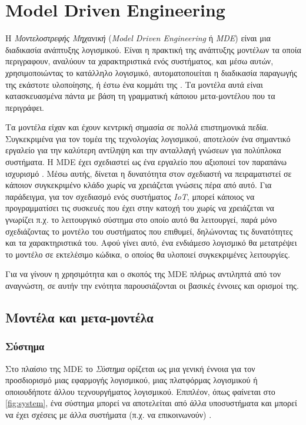 \section{Model Driven Engineering}
\label{sec:theory_mde}

Η \textit{Μοντελοστρεφής Μηχανική} (\textit{Model Driven Engineering} ή \textit{MDE}) είναι μια διαδικασία ανάπτυξης λογισμικού. Είναι η πρακτική της ανάπτυξης μοντέλων τα οποία περιγραφουν, αναλύουν τα χαρακτηριστικά ενός συστήματος, και μέσω αυτών, χρησιμοποιώντας το κατάλληλο λογισμικό, αυτοματοποιείται η διαδικασία παραγωγής της εκάστοτε υλοποίησης, ή έστω ένα κομμάτι της \cite{bib:brambilla_2012}. Τα μοντέλα αυτά είναι κατασκευασμένα πάντα με βάση τη γραμματική κάποιου μετα-μοντέλου που τα περιγράφει.

Τα μοντέλα είχαν και έχουν κεντρική σημασία σε πολλά επιστημονικά πεδία. Συγκεκριμένα για τον τομέα της τεχνολογίας λογισμικού, αποτελούν ένα σημαντικό εργαλείο για την καλύτερη αντίληψη και την ανταλλαγή γνώσεων για πολύπλοκα συστήματα. Η MDE έχει σχεδιαστεί ως ένα εργαλείο που αξιοποιεί τον παραπάνω ισχυρισμό . Μέσω αυτής, δίνεται η δυνατότητα στον σχεδιαστή να πειραματιστεί σε κάποιον συγκεκριμένο κλάδο χωρίς να χρειάζεται γνώσεις πέρα από αυτό. Για παράδειγμα, για τον σχεδιασμό ενός συστήματος \textit{IoT}, μπορεί κάποιος να προγραμματίσει τις συσκευές που έχει στην κατοχή του χωρίς να χρειάζεται να γνωρίζει π.χ. το λειτουργικό σύστημα στο οποίο αυτό θα λειτουργεί, παρά μόνο σχεδιάζοντας το μοντέλο του συστήματος που επιθυμεί, δηλώνοντας τις δυνατότητες και τα χαρακτηριστικά του. Αφού γίνει αυτό, ένα ενδιάμεσο λογισμικό θα μετατρέψει το μοντέλο σε εκτελέσιμο κώδικα, ο οποίος θα υλοποιεί συγκεκριμένες λειτουργίες.

Για να γίνουν η χρησιμότητα και ο σκοπός της MDE πλήρως αντιληπτά από τον αναγνώστη, σε αυτήν την ενότητα παρουσιάζονται οι βασικές έννοιες και ορισμοί της.

\subsection{Μοντέλα και μετα-μοντέλα}
\label{subsec:metamodels}

\subsubsection{Σύστημα}
\label{subsubsec:system}

Στο πλαίσιο της MDE το \textit{Σύστημα} ορίζεται ως μια γενική έννοια για τον προσδιορισμό μιας εφαρμογής λογισμικού, μιας πλατφόρμας λογισμικού ή οποιουδήποτε άλλου τεχνουργήματος λογισμικού. Επιπλέον, όπως φαίνεται στο \autoref{fig:system}, ένα σύστημα μπορεί να αποτελείται από άλλα υποσυστήματα και μπορεί να έχει σχέσεις με άλλα συστήματα (π.χ. να επικοινωνούν) \cite{bib:rodrigues_2015}.

